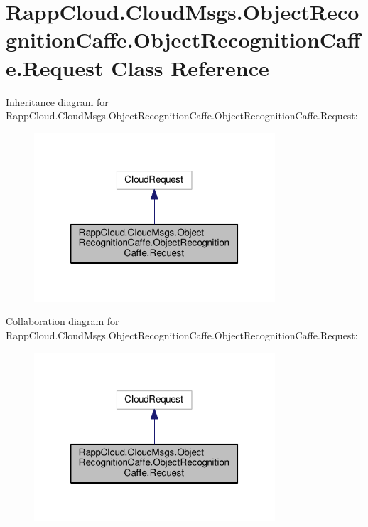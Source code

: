\hypertarget{classRappCloud_1_1CloudMsgs_1_1ObjectRecognitionCaffe_1_1ObjectRecognitionCaffe_1_1Request}{\section{Rapp\-Cloud.\-Cloud\-Msgs.\-Object\-Recognition\-Caffe.\-Object\-Recognition\-Caffe.\-Request Class Reference}
\label{classRappCloud_1_1CloudMsgs_1_1ObjectRecognitionCaffe_1_1ObjectRecognitionCaffe_1_1Request}
}


Inheritance diagram for Rapp\-Cloud.\-Cloud\-Msgs.\-Object\-Recognition\-Caffe.\-Object\-Recognition\-Caffe.\-Request\-:
\nopagebreak
\begin{figure}[H]
\begin{center}
\leavevmode
\includegraphics[width=254pt]{classRappCloud_1_1CloudMsgs_1_1ObjectRecognitionCaffe_1_1ObjectRecognitionCaffe_1_1Request__inherit__graph}
\end{center}
\end{figure}


Collaboration diagram for Rapp\-Cloud.\-Cloud\-Msgs.\-Object\-Recognition\-Caffe.\-Object\-Recognition\-Caffe.\-Request\-:
\nopagebreak
\begin{figure}[H]
\begin{center}
\leavevmode
\includegraphics[width=254pt]{classRappCloud_1_1CloudMsgs_1_1ObjectRecognitionCaffe_1_1ObjectRecognitionCaffe_1_1Request__coll__graph}
\end{center}
\end{figure}
